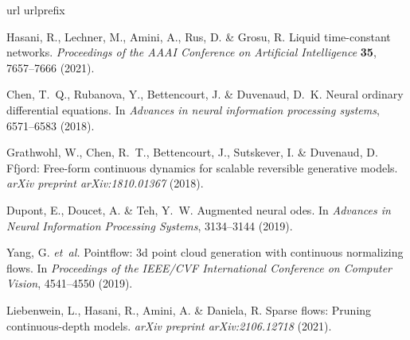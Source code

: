 \documentclass[12pt]{article}
\begin{document}
\begin{thebibliography}{10}
\expandafter\ifx\csname url\endcsname\relax
  \def\url#1{\texttt{#1}}\fi
\expandafter\ifx\csname urlprefix\endcsname\relax\def\urlprefix{URL }\fi
\providecommand{\bibinfo}[2]{#2}
\providecommand{\eprint}[2][]{\url{#2}}

\bibinfo{author}{Hasani, R.}, \bibinfo{author}{Lechner, M.},
  \bibinfo{author}{Amini, A.}, \bibinfo{author}{Rus, D.} \&
  \bibinfo{author}{Grosu, R.}
\newblock \bibinfo{title}{Liquid time-constant networks}.
\newblock \emph{\bibinfo{journal}{Proceedings of the AAAI Conference on
  Artificial Intelligence}} \textbf{\bibinfo{volume}{35}},
  \bibinfo{pages}{7657--7666} (\bibinfo{year}{2021}).

\bibinfo{author}{Chen, T.~Q.}, \bibinfo{author}{Rubanova, Y.},
  \bibinfo{author}{Bettencourt, J.} \& \bibinfo{author}{Duvenaud, D.~K.}
\newblock \bibinfo{title}{Neural ordinary differential equations}.
\newblock In \emph{\bibinfo{booktitle}{Advances in neural information
  processing systems}}, \bibinfo{pages}{6571--6583} (\bibinfo{year}{2018}).

\bibinfo{author}{Grathwohl, W.}, \bibinfo{author}{Chen, R.~T.},
  \bibinfo{author}{Bettencourt, J.}, \bibinfo{author}{Sutskever, I.} \&
  \bibinfo{author}{Duvenaud, D.}
\newblock \bibinfo{title}{Ffjord: Free-form continuous dynamics for scalable
  reversible generative models}.
\newblock \emph{\bibinfo{journal}{arXiv preprint arXiv:1810.01367}}
  (\bibinfo{year}{2018}).

\bibinfo{author}{Dupont, E.}, \bibinfo{author}{Doucet, A.} \&
  \bibinfo{author}{Teh, Y.~W.}
\newblock \bibinfo{title}{Augmented neural odes}.
\newblock In \emph{\bibinfo{booktitle}{Advances in Neural Information
  Processing Systems}}, \bibinfo{pages}{3134--3144} (\bibinfo{year}{2019}).

\bibinfo{author}{Yang, G.} \emph{et~al.}
\newblock \bibinfo{title}{Pointflow: 3d point cloud generation with continuous
  normalizing flows}.
\newblock In \emph{\bibinfo{booktitle}{Proceedings of the IEEE/CVF
  International Conference on Computer Vision}}, \bibinfo{pages}{4541--4550}
  (\bibinfo{year}{2019}).

\bibinfo{author}{Liebenwein, L.}, \bibinfo{author}{Hasani, R.},
  \bibinfo{author}{Amini, A.} \& \bibinfo{author}{Daniela, R.}
\newblock \bibinfo{title}{Sparse flows: Pruning continuous-depth models}.
\newblock \emph{\bibinfo{journal}{arXiv preprint arXiv:2106.12718}}
  (\bibinfo{year}{2021}).


\end{thebibliography}
\end{document}
